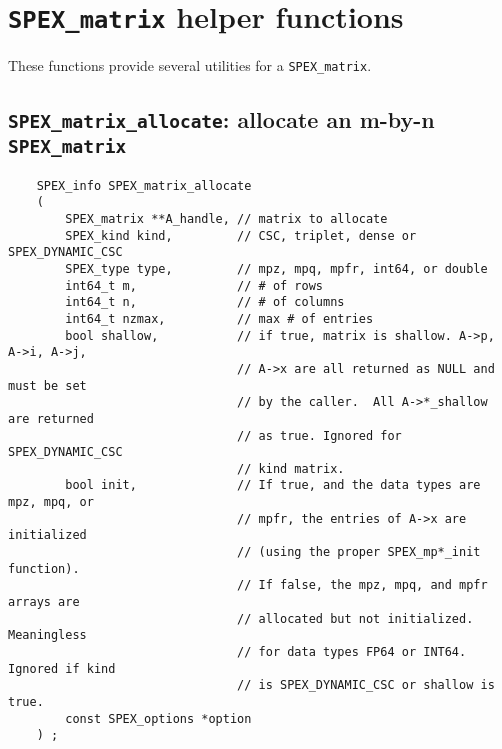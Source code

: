 \documentclass[12pt,oneside]{book}
\theoremstyle{definition}
\begin{document}
\section{\texttt{SPEX\_matrix} helper functions} \label{s:spex_matrix_functions}
These functions provide several utilities for a \verb|SPEX_matrix|.

\subsection{\texttt{SPEX\_matrix\_allocate}: allocate an m-by-n \texttt{SPEX\_matrix}}
\label{s:user:matrix_allocate}
\begin{mdframed}[userdefinedwidth=\textwidth]
{\footnotesize
\begin{verbatim}
    SPEX_info SPEX_matrix_allocate
    (
        SPEX_matrix **A_handle, // matrix to allocate
        SPEX_kind kind,         // CSC, triplet, dense or SPEX_DYNAMIC_CSC
        SPEX_type type,         // mpz, mpq, mpfr, int64, or double
        int64_t m,              // # of rows
        int64_t n,              // # of columns
        int64_t nzmax,          // max # of entries
        bool shallow,           // if true, matrix is shallow. A->p, A->i, A->j,
                                // A->x are all returned as NULL and must be set
                                // by the caller.  All A->*_shallow are returned
                                // as true. Ignored for SPEX_DYNAMIC_CSC
                                // kind matrix.
        bool init,              // If true, and the data types are mpz, mpq, or
                                // mpfr, the entries of A->x are initialized
                                // (using the proper SPEX_mp*_init function).
                                // If false, the mpz, mpq, and mpfr arrays are
                                // allocated but not initialized. Meaningless
                                // for data types FP64 or INT64. Ignored if kind
                                // is SPEX_DYNAMIC_CSC or shallow is true.
        const SPEX_options *option
    ) ;
\end{verbatim}
} \end{mdframed}
\end{document}
